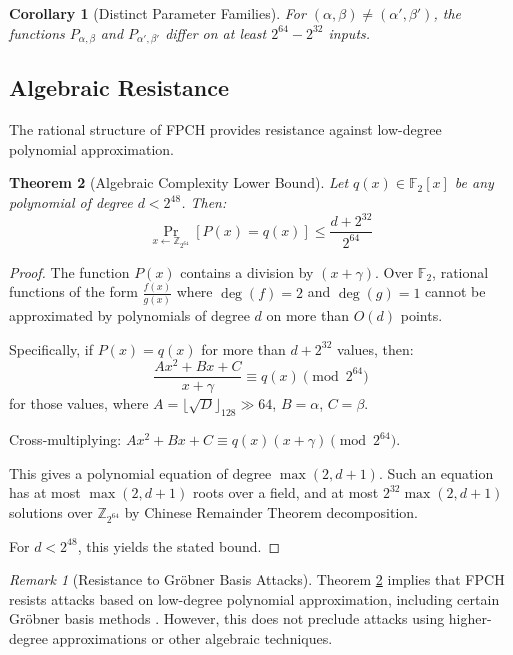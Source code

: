 \documentclass[11pt,a4paper]{article}
\theoremstyle{plain}
\newtheorem{theorem}{Theorem}[section]
\newtheorem{corollary}[theorem]{Corollary}
\theoremstyle{definition}
\theoremstyle{remark}
\newtheorem{remark}{Remark}[section]
\begin{document}
\begin{corollary}[Distinct Parameter Families]
For $(\alpha, \beta) \neq (\alpha', \beta')$, the functions $P_{\alpha,\beta}$ and $P_{\alpha',\beta'}$ differ on at least $2^{64} - 2^{32}$ inputs.
\end{corollary}

\subsection{Algebraic Resistance}

The rational structure of FPCH provides resistance against low-degree polynomial approximation.

\begin{theorem}[Algebraic Complexity Lower Bound]\label{thm:algebraic}
Let $q(x) \in \mathbb{F}_2[x]$ be any polynomial of degree $d < 2^{48}$. Then:
\begin{equation}
\Pr_{x \leftarrow \mathbb{Z}_{2^{64}}}[P(x) = q(x)] \leq \frac{d + 2^{32}}{2^{64}}
\end{equation}
\end{theorem}

\begin{proof}
The function $P(x)$ contains a division by $(x + \gamma)$. Over $\mathbb{F}_2$, rational functions of the form $\frac{f(x)}{g(x)}$ where $\deg(f) = 2$ and $\deg(g) = 1$ cannot be approximated by polynomials of degree $d$ on more than $O(d)$ points.

Specifically, if $P(x) = q(x)$ for more than $d + 2^{32}$ values, then:
\begin{equation}
\frac{Ax^2 + Bx + C}{x + \gamma} \equiv q(x) \pmod{2^{64}}
\end{equation}
for those values, where $A = \lfloor\sqrt{D}\rfloor_{128} \gg 64$, $B = \alpha$, $C = \beta$.

Cross-multiplying: $Ax^2 + Bx + C \equiv q(x)(x + \gamma) \pmod{2^{64}}$.

This gives a polynomial equation of degree $\max(2, d+1)$. Such an equation has at most $\max(2, d+1)$ roots over a field, and at most $2^{32}\max(2, d+1)$ solutions over $\mathbb{Z}_{2^{64}}$ by Chinese Remainder Theorem decomposition.

For $d < 2^{48}$, this yields the stated bound.
\end{proof}

\begin{remark}[Resistance to Gr\"obner Basis Attacks]
Theorem \ref{thm:algebraic} implies that FPCH resists attacks based on low-degree polynomial approximation, including certain Gr\"obner basis methods \cite{courtois2003}. However, this does not preclude attacks using higher-degree approximations or other algebraic techniques.
\end{remark}
\end{document}
